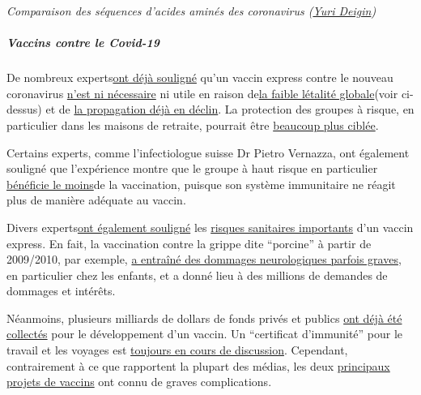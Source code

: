 \emph{Comparaison des séquences d'acides aminés des coronavirus
(\href{https://medium.com/@yurideigin/lab-made-cov2-genealogy-through-the-lens-of-gain-of-function-research-f96dd7413748}{Yuri
Deigin})}

\hypertarget{vaccins-contre-le-covid-19}{%
\subparagraph{\texorpdfstring{\textbf{Vaccins contre le
Covid-19}}{Vaccins contre le Covid-19}}\label{vaccins-contre-le-covid-19}}

De nombreux
experts\href{https://www.nature.com/articles/d41586-020-00751-9}{ont
déjà souligné} qu'un vaccin express contre le nouveau coronavirus
\href{https://www.youtube.com/watch?v=vrL9QKGQrWk}{n'est ni nécessaire}
ni utile en raison
de\href{https://www.bitchute.com/video/DXxeej9CW1pz/}{la faible létalité
globale}(voir ci-dessus) et de
\href{https://www.news.com.au/lifestyle/health/health-problems/no-vaccine-for-coronavirus-a-possibility/news-story/34e678ae205b50ea983cc64ab2943608}{la
propagation déjà en déclin}. La protection des groupes à risque, en
particulier dans les maisons de retraite, pourrait être
\href{https://www.reuters.com/article/us-health-coronavirus-haseltine-newsmake-idUSKBN22W34T}{beaucoup
plus ciblée}.

Certains experts, comme l'infectiologue suisse Dr Pietro Vernazza, ont
également souligné que l'expérience montre que le groupe à haut risque
en particulier
\href{https://infekt.ch/2020/05/corona-impfung-als-ultimative-rettung/}{bénéficie
le moins}de la vaccination, puisque son système immunitaire ne réagit
plus de manière adéquate au vaccin.

Divers
experts\href{https://www.nature.com/articles/d41586-020-00751-9}{ont
également souligné} les
\href{https://www.reuters.com/article/us-health-coronavirus-vaccines-insight-idUSKBN20Y1GZ}{risques
sanitaires importants} d'un vaccin express. En fait, la vaccination
contre la grippe dite ``porcine'' à partir de 2009/2010, par exemple,
\href{https://www.ibtimes.co.uk/brain-damaged-uk-victims-swine-flu-vaccine-get-60-million-compensation-1438572}{a
entraîné des dommages neurologiques parfois graves}, en particulier chez
les enfants, et a donné lieu à des millions de demandes de dommages et
intérêts.

Néanmoins, plusieurs milliards de dollars de fonds privés et publics
\href{https://www.nytimes.com/2020/05/04/world/europe/eu-coronavirus-vaccine.html}{ont
déjà été collectés} pour le développement d'un vaccin. Un ``certificat
d'immunité'' pour le travail et les voyages est
\href{https://www.theguardian.com/politics/2020/may/03/coronavirus-health-passports-for-uk-possible-in-months}{toujours
en cours de discussion}. Cependant, contrairement à ce que rapportent la
plupart des médias, les deux
\href{https://www.thelancet.com/journals/lancet/article/PIIS0140-6736(20)31252-6/fulltext}{principaux
projets de vaccins} ont connu de graves complications.

